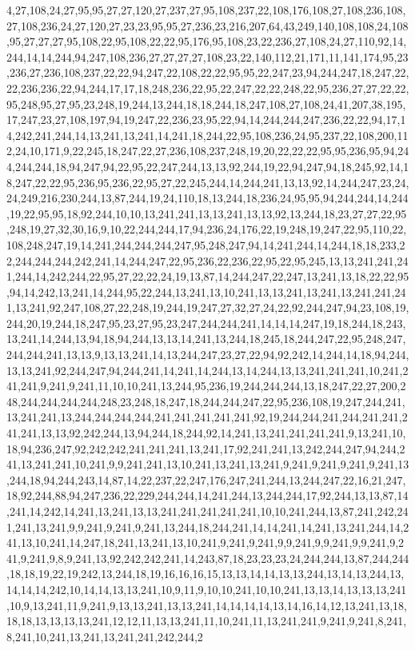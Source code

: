4,27,108,24,27,95,95,27,27,120,27,237,27,95,108,237,22,108,176,108,27,108,236,108,27,108,236,24,27,120,27,23,23,95,95,27,236,23,216,207,64,43,249,140,108,108,24,108,95,27,27,27,95,108,22,95,108,22,22,95,176,95,108,23,22,236,27,108,24,27,110,92,14,244,14,14,244,94,247,108,236,27,27,27,27,108,23,22,140,112,21,171,11,141,174,95,23,236,27,236,108,237,22,22,94,247,22,108,22,22,95,95,22,247,23,94,244,247,18,247,22,22,236,236,22,94,244,17,17,18,248,236,22,95,22,247,22,22,248,22,95,236,27,27,22,22,95,248,95,27,95,23,248,19,244,13,244,18,18,244,18,247,108,27,108,24,41,207,38,195,17,247,23,27,108,197,94,19,247,22,236,23,95,22,94,14,244,244,247,236,22,22,94,17,14,242,241,244,14,13,241,13,241,14,241,18,244,22,95,108,236,24,95,237,22,108,200,112,24,10,171,9,22,245,18,247,22,27,236,108,237,248,19,20,22,22,22,95,95,236,95,94,244,244,244,18,94,247,94,22,95,22,247,244,13,13,92,244,19,22,94,247,94,18,245,92,14,18,247,22,22,95,236,95,236,22,95,27,22,245,244,14,244,241,13,13,92,14,244,247,23,24,24,249,216,230,244,13,87,244,19,24,110,18,13,244,18,236,24,95,95,94,244,244,14,244,19,22,95,95,18,92,244,10,10,13,241,241,13,13,241,13,13,92,13,244,18,23,27,27,22,95,248,19,27,32,30,16,9,10,22,244,244,17,94,236,24,176,22,19,248,19,247,22,95,110,22,108,248,247,19,14,241,244,244,244,247,95,248,247,94,14,241,244,14,244,18,18,233,22,244,244,244,242,241,14,244,247,22,95,236,22,236,22,95,22,95,245,13,13,241,241,241,244,14,242,244,22,95,27,22,22,24,19,13,87,14,244,247,22,247,13,241,13,18,22,22,95,94,14,242,13,241,14,244,95,22,244,13,241,13,10,241,13,13,241,13,241,13,241,241,241,13,241,92,247,108,27,22,248,19,244,19,247,27,32,27,24,22,92,244,247,94,23,108,19,244,20,19,244,18,247,95,23,27,95,23,247,244,244,241,14,14,14,247,19,18,244,18,243,13,241,14,244,13,94,18,94,244,13,13,14,241,13,244,18,245,18,244,247,22,95,248,247,244,244,241,13,13,9,13,13,241,14,13,244,247,23,27,22,94,92,242,14,244,14,18,94,244,13,13,241,92,244,247,94,244,241,14,241,14,244,13,14,244,13,13,241,241,241,10,241,241,241,9,241,9,241,11,10,10,241,13,244,95,236,19,244,244,244,13,18,247,22,27,200,248,244,244,244,244,248,23,248,18,247,18,244,244,247,22,95,236,108,19,247,244,241,13,241,241,13,244,244,244,244,241,241,241,241,241,92,19,244,244,241,244,241,241,241,241,13,13,92,242,244,13,94,244,18,244,92,14,241,13,241,241,241,241,9,13,241,10,18,94,236,247,92,242,242,241,241,241,13,241,17,92,241,241,13,242,244,247,94,244,241,13,241,241,10,241,9,9,241,241,13,10,241,13,241,13,241,9,241,9,241,9,241,9,241,13,244,18,94,244,243,14,87,14,22,237,22,247,176,247,241,244,13,244,247,22,16,21,247,18,92,244,88,94,247,236,22,229,244,244,14,241,244,13,244,244,17,92,244,13,13,87,14,241,14,242,14,241,13,241,13,13,241,241,241,241,241,10,10,241,244,13,87,241,242,241,241,13,241,9,9,241,9,241,9,241,13,244,18,244,241,14,14,241,14,241,13,241,244,14,241,13,10,241,14,247,18,241,13,241,13,10,241,9,241,9,241,9,9,241,9,9,241,9,9,241,9,241,9,241,9,8,9,241,13,92,242,242,241,14,243,87,18,23,23,23,24,244,244,13,87,244,244,18,18,19,22,19,242,13,244,18,19,16,16,16,15,13,13,14,14,13,13,244,13,14,13,244,13,14,14,14,242,10,14,14,13,13,241,10,9,11,9,10,10,241,10,10,241,13,13,14,13,13,13,241,10,9,13,241,11,9,241,9,13,13,241,13,13,241,14,14,14,14,13,14,16,14,12,13,241,13,18,18,18,13,13,13,13,241,12,12,11,13,13,241,11,10,241,11,13,241,241,9,241,9,241,8,241,8,241,10,241,13,241,13,241,241,242,244,2